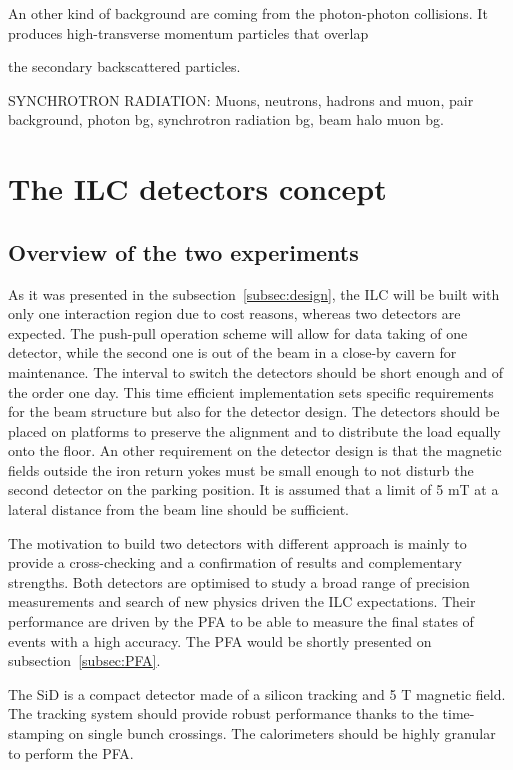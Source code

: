     An other kind of background are coming from the photon-photon collisions.
    It produces high-transverse momentum particles that overlap 
    
    
    the secondary backscattered particles.

    SYNCHROTRON RADIATION: Muons, neutrons, hadrons and muon, pair background, photon bg, synchrotron radiation bg, beam halo muon bg.


  \section{The ILC detectors concept}
  \label{sec:detectors}

    \subsection{Overview of the two experiments}
    

  As it was presented in the subsection~\ref{subsec:design}, the \acrshort{ILC} will be built with only one interaction region due to cost reasons, whereas two detectors are expected.
  The push-pull operation scheme will allow for data taking of one detector, while the second one is out of the beam in a close-by cavern for maintenance.
  The interval to switch the detectors should be short enough and of the order one day.
  This time efficient implementation sets specific requirements for the beam structure but also for the detector design.
  The detectors should be placed on platforms to preserve the alignment and to distribute the load equally onto the floor.
  An other requirement on the detector design is that the magnetic fields outside the iron return yokes must be small enough to not disturb the second detector on the parking position.
  It is assumed that a limit of 5 mT at a lateral distance from the beam line should be sufficient.

  The motivation to build two detectors with different approach is mainly to provide a cross-checking and a confirmation of results and complementary strengths.
  Both detectors are optimised to study a broad range of precision measurements and search of new physics driven the \acrshort{ILC} expectations.
  Their performance are driven by the \acrshort{PFA} to be able to measure the final states of events with a high accuracy.
  The \acrshort{PFA} would be shortly presented on subsection~\ref{subsec:PFA}.

  The \acrshort{SiD} is a compact detector made of a silicon tracking and 5 T magnetic field.
  The tracking system should provide robust performance thanks to the time-stamping on single bunch crossings.
  The calorimeters should be highly granular to perform the \acrshort{PFA}.

